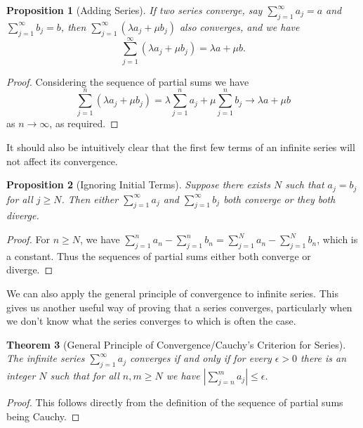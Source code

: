 \documentclass[11pt, a4paper]{article}
\newtheorem{theorem}{Theorem}[section]
\newtheorem{proposition}[theorem]{Proposition}
\theoremstyle{definition}
\newtheorem{example}[theorem]{Example}
\begin{document}
\begin{proposition}[Adding Series]
	If two series converge, say $\sum_{j = 1}^{\infty} a_j = a$ and $\sum_{j = 1}^{\infty} b_j = b$, then $\sum_{j = 1}^{\infty} (\lambda a_j + \mu b_j)$ also converges, and we have
	$$
	\sum_{j = 1}^{\infty} (\lambda a_j + \mu b_j) = \lambda a + \mu b.
	$$
\end{proposition}
\begin{proof}
	Considering the sequence of partial sums we have
	$$
	\sum_{j = 1}^n (\lambda a_j + \mu b_j) = \lambda \sum_{j=1}^n a_j + \mu \sum_{j = 1}^n b_j \longrightarrow \lambda a + \mu b
	$$
	as $n \rightarrow \infty$, as required.
\end{proof}

It should also be intuitively clear that the first few terms of an infinite series will not affect its convergence.

\begin{proposition}[Ignoring Initial Terms]
Suppose there exists $N$ such that $a_j = b_j$ for all $j \geq N$. Then either $\sum_{j = 1}^{\infty} a_j$ and $\sum_{j = 1}^{\infty} b_j$ both converge or they both diverge.
\end{proposition}
\begin{proof}
	For $n \geq N$, we have $\sum_{j = 1}^n a_n - \sum_{j = 1}^n b_n =  \sum_{j = 1}^N a_n - \sum_{j = 1}^N b_n$, which is a constant. Thus the sequences of partial sums either both converge or diverge.
\end{proof}

We can also apply the general principle of convergence to infinite series. This gives us another useful way of proving that a series converges, particularly when we don't know what the series converges to which is often the case.

\begin{theorem}[General Principle of Convergence/Cauchy's Criterion for Series]
	The infinite series $\sum_{j = 1}^{\infty} a_j$ converges if and only if for every $\epsilon > 0$ there is an integer $N$ such that for all $n, m \geq N$ we have $|\sum_{j = n}^m a_j| \leq \epsilon$.
\end{theorem}
\begin{proof}
	This follows directly from the definition of the sequence of partial sums being Cauchy.
\end{proof}


\end{document}
